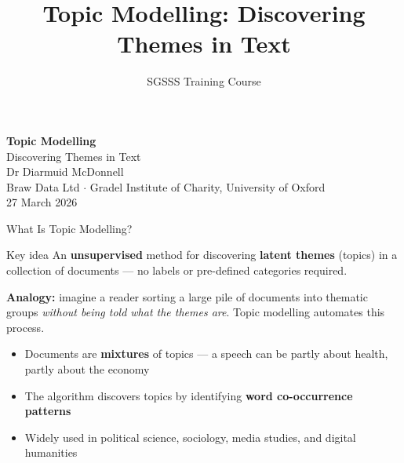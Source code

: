 \documentclass[aspectratio=169]{beamer}
\title{Topic Modelling: Discovering Themes in Text}
\subtitle{SGSSS Training Course}
\begin{document}
{
\begin{frame}[plain]
    \begin{center}
        \vspace{1.5cm}
        {\Large\bfseries\color{sgsssMagenta} Topic Modelling}\\[0.3cm]
        {\large Discovering Themes in Text}\\[0.8cm]
        {\normalsize Dr Diarmuid McDonnell}\\[0.1cm]
        {\small Braw Data Ltd \(\cdot\) Gradel Institute of Charity, University of Oxford}\\[0.3cm]
        {\small 27 March 2026}
    \end{center}
\end{frame}
}

\begin{frame}{What Is Topic Modelling?}
    \begin{alertblock}{Key idea}
        An \textbf{unsupervised} method for discovering \textbf{latent themes} (topics) in a collection of documents --- no labels or pre-defined categories required.
    \end{alertblock}

    \textbf{Analogy:} imagine a reader sorting a large pile of documents into thematic groups \textit{without being told what the themes are}. Topic modelling automates this process.

    \vspace{0.3cm}
    \begin{itemize}\setlength\itemsep{0pt}
        \item {} Documents are \textbf{mixtures} of topics --- a speech can be partly about health, partly about the economy
        \item {} The algorithm discovers topics by identifying \textbf{word co-occurrence patterns}
        \item {} Widely used in political science, sociology, media studies, and digital humanities
    \end{itemize}
\end{frame}
\end{document}
